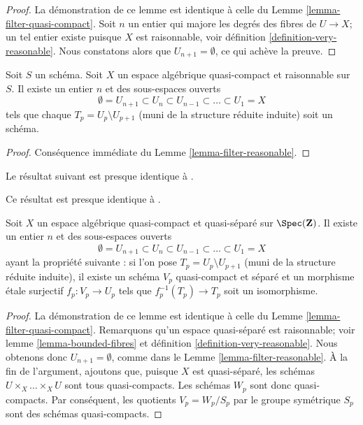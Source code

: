 \begin{proof}
La démonstration de ce lemme est identique à celle du
Lemme \ref{lemma-filter-quasi-compact}.
Soit $n$ un entier qui majore les degrés des fibres de $U \to X$;
un tel entier existe puisque $X$ est raisonnable, voir
définition \ref{definition-very-reasonable}.
Nous constatons alors que $U_{n + 1} = \emptyset$, ce qui achève la preuve.
\end{proof}

\begin{lemma}
\label{lemma-stratify-reasonable}
Soit $S$ un schéma. Soit $X$ un espace algébrique quasi-compact et raisonnable
sur $S$. Il existe un entier $n$ et des sous-espaces ouverts
$$
\emptyset = U_{n + 1} \subset
U_n \subset U_{n - 1} \subset \ldots \subset U_1 = X
$$
tels que chaque $T_p = U_p \setminus U_{p + 1}$ (muni de la structure réduite
induite) soit un schéma.
\end{lemma}

\begin{proof}
Conséquence immédiate du Lemme \ref{lemma-filter-reasonable}.
\end{proof}

\noindent
Le résultat suivant est presque identique à
\cite[Proposition 5.7.8]{GruRay}.

\begin{lemma}
\label{lemma-filter-quasi-compact-quasi-separated}
\begin{reference}
Ce résultat est presque identique à \cite[Proposition 5.7.8]{GruRay}.
\end{reference}
Soit $X$ un espace algébrique quasi-compact et quasi-séparé sur
$\Spec(\mathbf{Z})$. Il existe un entier $n$ et des sous-espaces ouverts
$$
\emptyset = U_{n + 1} \subset
U_n \subset U_{n - 1} \subset \ldots \subset U_1 = X
$$
ayant la propriété suivante : si l'on pose $T_p = U_p \setminus U_{p + 1}$
(muni de la structure réduite induite), il existe un schéma $V_p$
quasi-compact et séparé et un morphisme étale surjectif
$f_p : V_p \to U_p$ tels que $f_p^{-1}(T_p) \to T_p$ soit un isomorphisme.
\end{lemma}

\begin{proof}
La démonstration de ce lemme est identique à celle du
Lemme \ref{lemma-filter-quasi-compact}.
Remarquons qu'un espace quasi-séparé est raisonnable; voir
lemme \ref{lemma-bounded-fibres} et
définition \ref{definition-very-reasonable}.
Nous obtenons donc $U_{n + 1} = \emptyset$, comme dans le
Lemme \ref{lemma-filter-reasonable}.
À la fin de l'argument, ajoutons que, puisque $X$ est quasi-séparé,
les schémas $U \times_X \ldots \times_X U$ sont tous quasi-compacts.
Les schémas $W_p$ sont donc quasi-compacts. Par conséquent, les quotients
$V_p = W_p/S_p$ par le groupe symétrique $S_p$ sont des schémas
quasi-compacts.
\end{proof}

